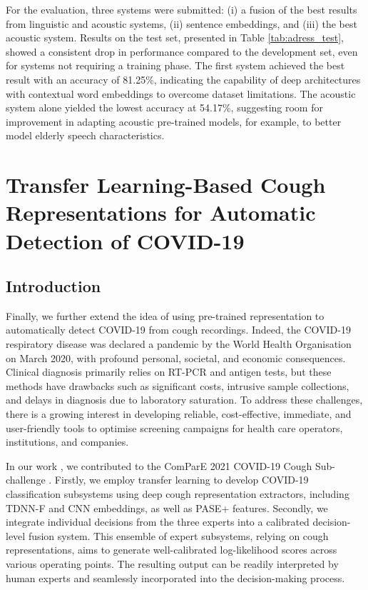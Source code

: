   For the evaluation, three systems were submitted: (i) a fusion of the best results from linguistic and acoustic systems, (ii) sentence embeddings, and (iii) the best acoustic system. Results on the test set, presented in Table \ref{tab:adress_test}, showed a consistent drop in performance compared to the development set, even for systems not requiring a training phase. The first system achieved the best result with an accuracy of 81.25\%, indicating the capability of deep architectures with contextual word embeddings to overcome dataset limitations. The acoustic system alone yielded the lowest accuracy at 54.17\%, suggesting room for improvement in adapting acoustic pre-trained models, for example, to better model elderly speech characteristics.



\section{Transfer Learning-Based Cough Representations for Automatic Detection of COVID-19}
\subsection{Introduction}
Finally, we further extend the idea of using pre-trained representation to automatically detect COVID-19 from cough recordings. Indeed, the COVID-19 respiratory disease was declared a pandemic by the World Health Organisation on March 2020, with profound personal, societal, and economic consequences. Clinical diagnosis primarily relies on RT-PCR and antigen tests, but these methods have drawbacks such as significant costs, intrusive sample collections, and delays in diagnosis due to laboratory saturation. To address these challenges, there is a growing interest in developing reliable, cost-effective, immediate, and user-friendly tools to optimise screening campaigns for health care operators, institutions, and companies.

In our work \cite{SoleraUrea2021TransferLC}, we contributed to the ComParE 2021 COVID-19 Cough Sub-challenge \cite{schuller21_interspeech}. Firstly, we employ transfer learning to develop COVID-19 classification subsystems using deep cough representation extractors, including TDNN-F and CNN embeddings, as well as PASE+ features. Secondly, we integrate individual decisions from the three experts into a calibrated decision-level fusion system. This ensemble of expert subsystems, relying on cough representations, aims to generate well-calibrated log-likelihood scores across various operating points. The resulting output can be readily interpreted by human experts and seamlessly incorporated into the decision-making process.

